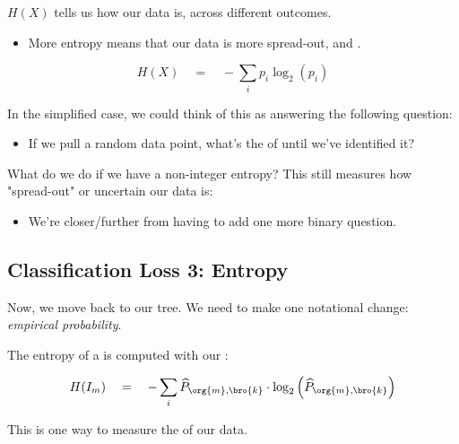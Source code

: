         \begin{definition}
             $H(X)$ tells us how  our data is, across different outcomes.

            \begin{itemize}
                \item More entropy means that our data is more spread-out, and .
            \end{itemize}

            \begin{equation*}
                H(X) \quad=\quad - \sum_i p_i \log_2 (p_i)
            \end{equation*}

            \subsecdiv

            In the simplified case, we could think of this as answering the following question:

            \begin{itemize}
                \item If we pull a random data point, what's the  of  until we've identified it?
            \end{itemize}
        \end{definition}    

        What do we do if we have a non-integer entropy? This still measures how "spread-out" or uncertain our data is: 
        
        \begin{itemize}
            \item We're closer/further from having to add one more binary question.
        \end{itemize}



    \phantom{}

    \subsection{Classification Loss 3: Entropy}

        Now, we move back to our tree. We need to make one notational change: \textit{empirical probability}.\\

        \begin{kequation}
            The entropy of a  is computed with our :

            \begin{equation*}
                H(I_m) \quad=\quad - \sum_i 
                \widehat{P}_{\org{m},\bro{k}} \cdot
                \log_2 \Big( \widehat{P}_{\org{m},\bro{k}} \Big)
            \end{equation*}

            This is one way to measure the  of our data.
            
        \end{kequation}

